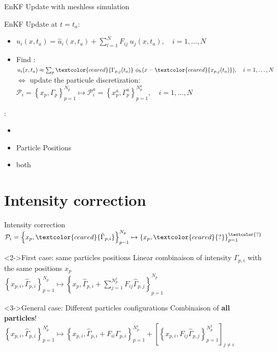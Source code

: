 \documentclass[aspectratio=169]{beamer} %
\begin{document}
\begin{frame}{EnKF Update with meshless simulation}
    \begin{block}{EnKF Update at $t=t_a$:}
        \begin{itemize}
            \item $u_i(x, t_a) = \hat u_i(x, t_a) + \sum_{l=1}^{N} F_{ij}~\hat u_j(x, t_a), \quad i = 1, \dots, N$ \\
            \item<2-> Find : $u_i(x, t_a) \approx \sum_p \textcolor{ceared}{\Gamma_{p, j}(t_a)}~\phi_h (x - \textcolor{ceared}{x_{p, j}(t_a)}), \quad i = 1, \dots, N$\\
                $\Leftrightarrow$ update the particule discretization: $\mathcal P_i = \left\{x_p, \Gamma_p\right\}_{p=1}^{N_p} \mapsto \mathcal P_i^a = \left\{x_p^a, \Gamma^a_p\right\}_{p=1}^{N^a_p}, \quad i = 1, \dots, N$
        \end{itemize}
    \end{block}
    \vfill

    :
    \begin{itemize}
        \item<3->   
        \item<3-> Particle Positions
        \item<3-> both
    \end{itemize}
\end{frame}

\section{Intensity correction}
\begin{frame}{Intensity correction}
    $\mathcal{P}_i = \left\{x_p, \textcolor{ceared}{\hat \Gamma_{p, i}}\right\}_{p=1}^{N_p} \mapsto \left\{x_p, \textcolor{ceared}{?} \right\}_{p=1}^{\textcolor{?}}$

    \begin{block}<2->{First case: same particles positions}
        Linear combinaison of intensity $\Gamma_{p,i}$ with the same positions $x_p$\\
        $\left\{x_{p,i}, \hat \Gamma_{p,i}\right\}_{p=1}^{N_p} \mapsto \left\{x_p, \hat \Gamma_{p, i} + \sum_{j=1}^{N_p^j} F_{ij} \hat \Gamma_{p,j} \right\}_{p=1}^{N_p}$
    \end{block}
    \begin{block}<3->{General case: Different particles configurations}
        Combinaison of \textbf{all particles}! \\
        $ \left\{x_{p,i}, \hat \Gamma_{p,i}\right\}_{p=1}^{N^i_p} \mapsto \left\{x_{p,i}, \hat \Gamma_{p,i} + F_{ii}\Gamma_{p,i} \right\}_{p=1}^{N_p^i} + \left[\left\{x_{p,i}, F_{ij} \hat \Gamma_{p,j}\right\}_{p=1}^{N_p^j}\right]_{j\neq i}$ \\
    \end{block}
\end{frame}
\end{document}
